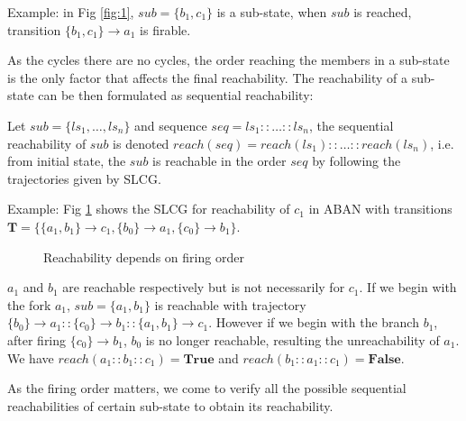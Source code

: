 \documentclass[runningheads]{llncs}
\newcommand{\acm}[3]{\{#1\}\rightarrow#3}
\newcommand{\ac}[3]{$\{#1\}\rightarrow#3$}
\begin{document}
Example: in Fig \ref{fig:1}, $sub=\{ b_1,c_1\}$ is a sub-state, when $sub$ is reached, transition \ac{b_1,c_1}{a_0}{a_1} is firable.

As the cycles there are no cycles, the order reaching the members in a sub-state is the only factor that affects the final reachability. 
The reachability of a sub-state can be then formulated as sequential reachability:
\begin{definition}
Let $sub=\{ls_1,\ldots,ls_n\}$ and sequence $seq=ls_1::\ldots::ls_n$, the sequential reachability of $sub$ is denoted $reach (seq)=reach (ls_1)::\ldots::reach (ls_n)$, i.e. from initial state, the $sub$ is reachable in the order $seq$ by following the trajectories given by SLCG.
\end{definition}

Example: Fig \ref{fig:5} shows the SLCG for reachability of $c_1$ in ABAN with transitions $\mathbf{T}=\{\acm{a_1,b_1}{c_0}{c_1},\acm{b_0}{a_0}{a_1},\acm{c_0}{b_0}{b_1}\}$.
\begin{figure}[ht]
\centering

\caption{Reachability depends on firing order}
\label{fig:5}
\end{figure}

$a_1$ and $b_1$ are reachable respectively but is not necessarily for $c_1$.
If we begin with the fork $a_1$, $sub=\{a_1,b_1\}$ is reachable with trajectory $\acm{b_0}{a_0}{a_1}::\acm{c_0}{b_0}{b_1}::\acm{a_1,b_1}{c_0}{c_1}$. 
However if we begin with the branch $b_1$, after firing $\acm{c_0}{b_0}{b_1}$, $b_0$ is no longer reachable, resulting the unreachability of $a_1$.
We have $reach (a_1::b_1::c_1)=\mathbf{True}$ and $reach (b_1::a_1::c_1)=\mathbf{False}$.

As the firing order matters, we come to verify all the possible sequential reachabilities of certain sub-state to obtain its reachability.
\end{document}
